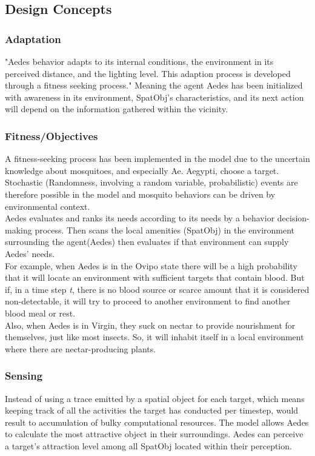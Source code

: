 \subsection{Design Concepts}

\subsubsection{Adaptation}
	"Aedes behavior adapts to its internal conditions, the environment in its perceived distance, and the lighting level. This adaption process is developed through a fitness seeking process." Meaning the agent Aedes has been initialized with awareness in its environment, SpatObj's characteristics, and its next action will depend on the information gathered within the vicinity.
\subsubsection{Fitness/Objectives}{
    A fitness-seeking process \cite{grimm}has been implemented in the model due to the uncertain knowledge about mosquitoes, and especially Ae. Aegypti, choose a target. Stochastic (Randomness, involving a random variable, probabilistic) events are therefore possible in the model and mosquito behaviors can be driven by environmental context.\\
    
	Aedes evaluates and ranks its needs according to its needs by a behavior decision-making process. Then scans the local amenities (SpatObj) in the environment surrounding the agent(Aedes) then evaluates if that environment can supply Aedes' needs.\\
	
	For example, when Aedes is in the Ovipo state there will be a high probability that it will locate an environment with sufficient targets that contain blood. But if, in a time step \textit{t}, there is no blood source or scarce amount that it is considered non-detectable, it will try to proceed to another environment to find another blood meal or rest.\\
	
	Also, when Aedes is in Virgin, they suck on nectar to provide nourishment for themselves, just like most insects. So, it will inhabit itself in a local environment where there are nectar-producing plants.

}
\subsubsection{Sensing}
Instead of using a trace emitted by a spatial object for each target\cite{cummins}, which means keeping track of all the activities the target has conducted per timestep, would result to accumulation of bulky computational resources. The model allows Aedes to calculate the most attractive object in their surroundings. Aedes can perceive a target’s attraction level among all SpatObj located within their perception.

